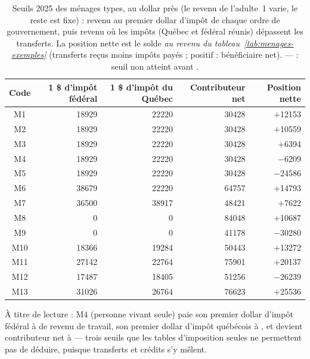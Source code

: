 \begin{table}[ht]
\centering
\small
\begin{tabular}{c r r r r}
\toprule
Code & 1\ier{} \$ d'impôt fédéral & 1\ier{} \$ d'impôt du Québec & Contributeur net & Position nette \\
\midrule
M1 & \num{18929} & \num{22220} & \num{30428} & $+$\num{12153} \\
M2 & \num{18929} & \num{22220} & \num{30428} & $+$\num{10559} \\
M3 & \num{18929} & \num{22220} & \num{30428} & $+$\num{6394} \\
M4 & \num{18929} & \num{22220} & \num{30428} & $-$\num{6209} \\
M5 & \num{18929} & \num{22220} & \num{30428} & $-$\num{24586} \\
M6 & \num{38679} & \num{22220} & \num{64757} & $+$\num{14793} \\
M7 & \num{36500} & \num{38917} & \num{48421} & $+$\num{7622} \\
M8 & \num{0} & \num{0} & \num{84048} & $+$\num{10687} \\
M9 & \num{0} & \num{0} & \num{41178} & $-$\num{30280} \\
M10 & \num{18366} & \num{19284} & \num{50443} & $+$\num{13272} \\
M11 & \num{27142} & \num{22764} & \num{75901} & $+$\num{20137} \\
M12 & \num{17487} & \num{18405} & \num{51256} & $-$\num{26239} \\
M13 & \num{31026} & \num{26764} & \num{76623} & $+$\num{25536} \\
\bottomrule
\end{tabular}
\caption{Seuils 2025 des ménages types, au dollar près (le revenu de
l'adulte~1 varie, le reste est fixe) : revenu au premier dollar d'impôt de
chaque ordre de gouvernement, puis revenu où les impôts (Québec et fédéral
réunis) dépassent les transferts. La \og position nette \fg{} est le solde
\emph{au revenu du tableau~\ref{tab:menages-exemples}} (transferts reçus
moins impôts payés ; positif : bénéficiaire net). \og --- \fg{} :
seuil non atteint avant .}
\label{tab:seuils-menages}
\end{table}

\noindent À titre de lecture : M4 (personne vivant seule) paie son premier
dollar d'impôt fédéral à  de revenu de
travail, son premier dollar d'impôt québécois à ,
et devient contributeur net à  ---
trois seuils que les tables d'imposition seules ne permettent pas de
déduire, puisque transferts et crédits s'y mêlent.
